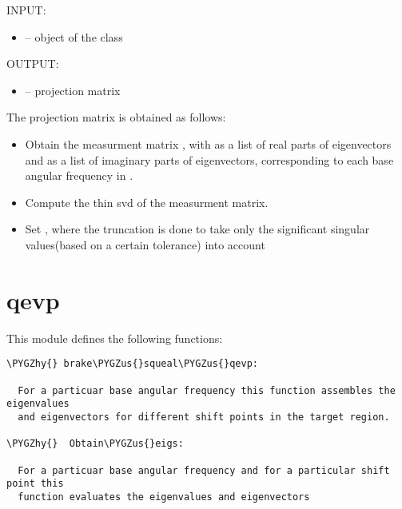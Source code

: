 \documentclass[letterpaper,10pt,english]{sphinxmanual}
\def\PYGZus{\char`\_}
\def\PYGZhy{\char`\-}
\begin{document}
\begin{fulllineitems}
\label{index:projection.obtain_projection_matrix}
INPUT:
\begin{itemize}
\item {} 
 -- object of the class 

\end{itemize}

OUTPUT:
\begin{itemize}
\item {} 
 -- projection matrix

\end{itemize}

The projection matrix is obtained as follows:
\begin{itemize}
\item {} 
Obtain the measurment matrix , with  as a list of 
real parts of eigenvectors and  as a list of imaginary parts of 
eigenvectors, corresponding to each base angular frequency in .

\item {} 
Compute the thin svd of the measurment matrix. 

\item {} 
Set , where the truncation is done to take only the significant 
singular values(based on a certain tolerance) into account

\end{itemize}

\end{fulllineitems}



\section{qevp}
\label{index:qevp}\label{index:module-qevp}
This module defines the following functions:

\begin{Verbatim}[commandchars=\\\{\}]
\PYGZhy{} brake\PYGZus{}squeal\PYGZus{}qevp:

  For a particuar base angular frequency this function assembles the eigenvalues
  and eigenvectors for different shift points in the target region.
  
\PYGZhy{}  Obtain\PYGZus{}eigs:
  
  For a particuar base angular frequency and for a particular shift point this 
  function evaluates the eigenvalues and eigenvectors
\end{Verbatim}
\end{document}
